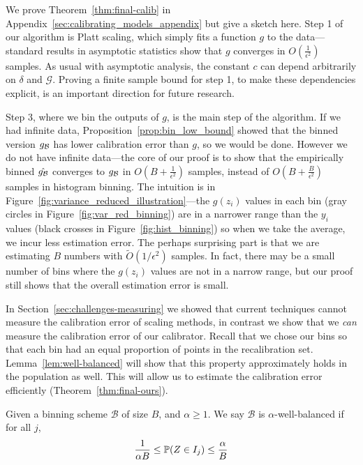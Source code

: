 We prove Theorem~\ref{thm:final-calib} in Appendix~\ref{sec:calibrating_models_appendix} but give a sketch here. Step 1 of our algorithm is Platt scaling, which simply fits a function $g$ to the data---standard results in asymptotic statistics show that $g$ converges in $O(\frac{1}{\epsilon^2})$ samples. As usual with asymptotic analysis, the constant $c$ can depend arbitrarily on $\delta$ and $\mathcal{G}$.
Proving a finite sample bound for step 1, to make these dependencies explicit, is an important direction for future research.

Step 3, where we bin the outputs of $g$, is the main step of the algorithm. If we had infinite data, Proposition~\ref{prop:bin_low_bound} showed that the binned version $g_{\mathcal{B}{}}$ has lower calibration error than $g$, so we would be done. However we do not have infinite data---the core of our proof is to show that the empirically binned $\hat{g_{\mathcal{B}{}}}$ converges to $g_{\mathcal{B}{}}$ in $O(B + \frac{1}{\epsilon^2})$ samples, instead of $O(B + \frac{B}{\epsilon^2})$ samples in histogram binning. The intuition is in Figure~\ref{fig:variance_reduced_illustration}---the $g(z_i)$ values in each bin (gray circles in Figure~\ref{fig:var_red_binning}) are in a narrower range than the $y_i$ values (black crosses in Figure~\ref{fig:hist_binning}) so when we take the average, we incur less estimation error. The perhaps surprising part is that we are estimating $B$ numbers with $\widetilde{O}(1/\epsilon^2)$ samples. In fact, there may be a small number of bins where the $g(z_i)$ values are not in a narrow range, but our proof still shows that the overall estimation error is small.

In Section~\ref{sec:challenges-measuring} we showed that current techniques cannot measure the calibration error of scaling methods, in contrast we show that we \emph{can} measure the calibration error of our calibrator. Recall that we chose our bins so that each bin had an equal proportion of points in the recalibration set. Lemma~\ref{lem:well-balanced} will show that this property approximately holds in the population as well. This will allow us to estimate the calibration error efficiently (Theorem~\ref{thm:final-ours}).

\begin{definition}
Given a binning scheme $\mathcal{B}$ of size $B$, and $\alpha \geq 1$. We say $\mathcal{B}$ is $\alpha$-well-balanced if for all $j$,
  \[ \frac{1}{\alpha B} \leq \mathbb{P}(Z \in I_j) \leq \frac{\alpha}{B}\]
\end{definition}

